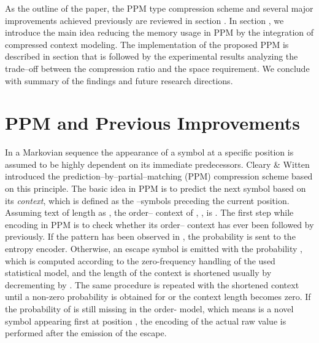 \documentclass[runningheads,a4paper]{llncs}
\begin{document}
As the outline of the paper, the PPM type compression scheme and several major improvements achieved previously 
are reviewed in section . 
In section , we introduce the main idea reducing the memory usage in PPM by the integration of  compressed
context modeling. 
The implementation of the proposed PPM is described in section  that is followed by the experimental results
analyzing the trade--off between the compression ratio and the space requirement. 
We conclude with summary of the findings and future research directions.


\section{PPM and Previous Improvements}

In a Markovian sequence the appearance of a symbol at a specific position is assumed to be highly dependent on its
immediate predecessors. 
Cleary \& Witten \cite{CW84} introduced the prediction--by--partial--matching ({PPM}) compression scheme based on this
principle. 
The basic idea in PPM is to predict the next symbol based on its \emph{context}, which is defined as the
--symbols preceding the current position. 
Assuming text  of length  as , the order-- context of , , is
. 
The first step while encoding  in PPM is to check whether its order-- context has ever been followed by 
previously.
If the pattern  has been observed in , the probability
 is sent to the entropy encoder. 
Otherwise, an escape symbol is emitted with the probability , which 
is computed according to the zero-frequency handling of the used statistical model, and the length of the context is
shortened usually by decrementing  by .
The same procedure is repeated with the shortened context until a non-zero probability is obtained for  
or the context length becomes zero. If the probability of  is still missing in the order- model, which means
 is a novel symbol appearing first at position , the encoding of the actual raw value is
performed after the emission of the escape. 
\end{document}
